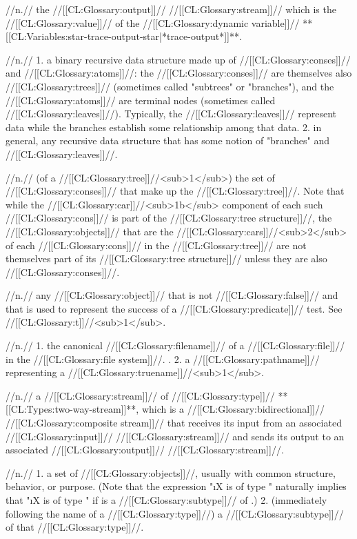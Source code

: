  //n.// the //[[CL:Glossary:output]]// //[[CL:Glossary:stream]]// which is the //[[CL:Glossary:value]]// of the //[[CL:Glossary:dynamic variable]]// **[[CL:Variables:star-trace-output-star|*trace-output*]]**.

 //n.// 1. a binary recursive data structure made up of //[[CL:Glossary:conses]]// and //[[CL:Glossary:atoms]]//: the //[[CL:Glossary:conses]]// are themselves also //[[CL:Glossary:trees]]// (sometimes called "subtrees" or "branches"), and the //[[CL:Glossary:atoms]]// are terminal nodes (sometimes called //[[CL:Glossary:leaves]]//). Typically, the //[[CL:Glossary:leaves]]// represent data while the branches establish some relationship among that data. 2. in general, any recursive data structure that has some notion of "branches" and //[[CL:Glossary:leaves]]//.
 
 //n.// (of a //[[CL:Glossary:tree]]//<sub>1</sub>) the set of //[[CL:Glossary:conses]]// that make up the //[[CL:Glossary:tree]]//. Note that while the //[[CL:Glossary:car]]//<sub>1b</sub> component of each such //[[CL:Glossary:cons]]// is part of the //[[CL:Glossary:tree structure]]//, the //[[CL:Glossary:objects]]// that are the //[[CL:Glossary:cars]]//<sub>2</sub> of each //[[CL:Glossary:cons]]// in the //[[CL:Glossary:tree]]// are not themselves part of its //[[CL:Glossary:tree structure]]// unless they are also //[[CL:Glossary:conses]]//.

 //n.// any //[[CL:Glossary:object]]// that is not //[[CL:Glossary:false]]// and that is used to represent the success of a //[[CL:Glossary:predicate]]// test. See //[[CL:Glossary:t]]//<sub>1</sub>.

 //n.// 1. the canonical //[[CL:Glossary:filename]]// of a //[[CL:Glossary:file]]// in the //[[CL:Glossary:file system]]//. \Seesection\Truenames. 2. a //[[CL:Glossary:pathname]]// representing a //[[CL:Glossary:truename]]//<sub>1</sub>.

 //n.// a //[[CL:Glossary:stream]]// of //[[CL:Glossary:type]]// **[[CL:Types:two-way-stream]]**, which is a //[[CL:Glossary:bidirectional]]// //[[CL:Glossary:composite stream]]// that receives its input from an associated //[[CL:Glossary:input]]// //[[CL:Glossary:stream]]// and sends its output to an associated //[[CL:Glossary:output]]// //[[CL:Glossary:stream]]//.

 //n.// 1. a set of //[[CL:Glossary:objects]]//, usually with common structure, behavior, or purpose. (Note that the expression "\i{X} is of type " naturally implies that "\i{X} is of type " if  is a //[[CL:Glossary:subtype]]// of .) 2. (immediately following the name of a //[[CL:Glossary:type]]//) a //[[CL:Glossary:subtype]]// of that //[[CL:Glossary:type]]//. 

